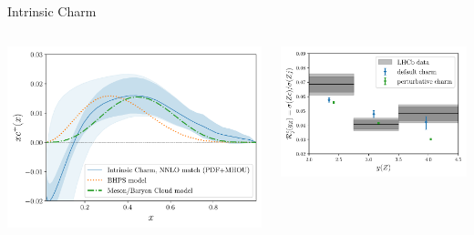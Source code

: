 \documentclass[9pt]{beamer}
\begin{document}
\begin{frame}{Intrinsic Charm}
    \begin{columns}
        \begin{column}{0.5\textwidth}
            \begin{tcolorbox}
                \includegraphics[width=\textwidth]{nf3_to_models}
            \end{tcolorbox}
        \end{column}
        \begin{column}{0.5\textwidth}
            \begin{tcolorbox}
                \includegraphics[width=\textwidth]{lhcb-zcharm-pheno}
            \end{tcolorbox}
        \end{column}
    \end{columns}
\end{frame}
\end{document}
